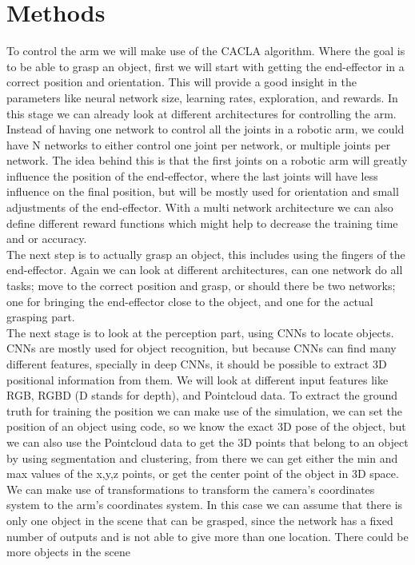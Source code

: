 \section{Methods}
To control the arm we will make use of the CACLA algorithm. Where the goal is to be able to grasp an object, first we will start with getting the end-effector in a correct position and orientation. This will provide a 
good insight in the parameters like neural network size, learning rates, exploration, and rewards. In this stage we can already look at different architectures for controlling the arm. Instead of having one network to
control all the joints in a robotic arm, we could have N networks to either control one joint per network, or multiple joints per network. The idea behind this is that the first joints on a robotic arm will 
greatly influence the position of the end-effector, where the last joints will have less influence on the final position, but will be mostly used for orientation and small adjustments of the end-effector. With a multi network
architecture we can also define different reward functions which might help to decrease the training time and or accuracy. \\
The next step is to actually grasp an object, this includes using the fingers of the end-effector. Again we can look at different architectures, can one network do all tasks; move to the correct position and grasp, or should
there be two networks; one for bringing the end-effector close to the object, and one for the actual grasping part. \\
The next stage is to look at the perception part, using CNNs to locate objects. CNNs are mostly used for object recognition, but because CNNs can find many different features, specially in deep CNNs, it should be possible to 
extract 3D positional information from them. We will look at different input features like RGB, RGBD (D stands for depth), and Pointcloud data. To extract the ground truth for training the position we can make use of the 
simulation, we can set the position of an object using code, so we know the exact 3D pose of the object, but we can also use the Pointcloud data to get the 3D points that belong to an object by using segmentation and clustering, 
from there we can get either the min and max values of the x,y,z points, or get the center point of the object in 3D space. We can make use of transformations to transform the camera's coordinates system to the arm's coordinates system. 
In this case we can assume that there is only one object in the scene that can be grasped, since the network has a fixed number of outputs and is not able to give more than one location. There could be more objects in the scene
